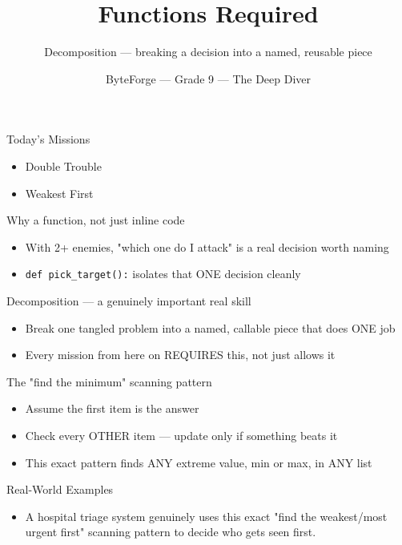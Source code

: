\documentclass[aspectratio=169]{beamer}
\title{Functions Required}
\subtitle{Decomposition --- breaking a decision into a named, reusable piece}
\author{ByteForge --- Grade 9 --- The Deep Diver}
\date{}
\begin{document}
\begin{frame}
    \titlepage
\end{frame}

\begin{frame}{Today's Missions}
    \Large
    \begin{itemize}
        \item Double Trouble
        \item Weakest First
    \end{itemize}
\end{frame}

\begin{frame}{Why a function, not just inline code}
    \large
    \begin{itemize}
        \item With 2+ enemies, "which one do I attack" is a real decision worth naming
        \item \texttt{def pick\_target():} isolates that ONE decision cleanly
    \end{itemize}
\end{frame}


\begin{frame}{Decomposition --- a genuinely important real skill}
    \large
    \begin{itemize}
        \item Break one tangled problem into a named, callable piece that does ONE job
        \item Every mission from here on REQUIRES this, not just allows it
    \end{itemize}
\end{frame}


\begin{frame}{The "find the minimum" scanning pattern}
    \large
    \begin{itemize}
        \item Assume the first item is the answer
        \item Check every OTHER item --- update only if something beats it
        \item This exact pattern finds ANY extreme value, min or max, in ANY list
    \end{itemize}
\end{frame}

\begin{frame}{Real-World Examples}
    \large
    \begin{itemize}
        \item A hospital triage system genuinely uses this exact "find the weakest/most urgent first" scanning pattern to decide who gets seen first.
    \end{itemize}
\end{frame}
\end{document}
